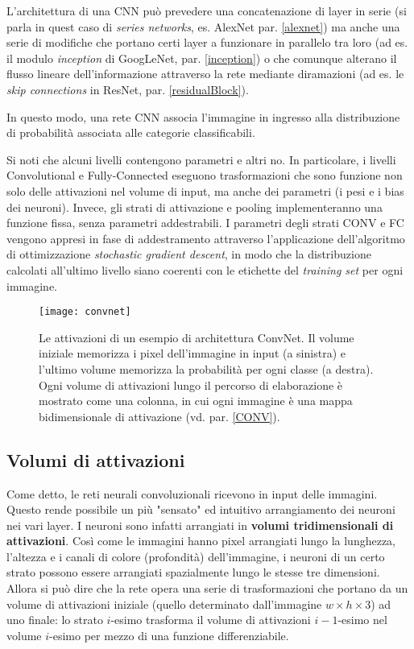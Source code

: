 L'architettura di una CNN può prevedere una concatenazione di layer in serie (si parla in quest caso di \textit{series networks}, es. AlexNet par. \ref{alexnet}) ma anche una serie di modifiche che portano certi layer a funzionare in parallelo tra loro (ad es. il modulo \textit{inception} di GoogLeNet, par. \ref{inception}) o che comunque alterano il flusso lineare dell'informazione attraverso la rete mediante diramazioni (ad es. le \textit{skip connections} in ResNet, par. \ref{residualBlock}).

In questo modo, una rete CNN associa l'immagine in ingresso alla distribuzione di probabilità associata alle categorie classificabili.

Si noti che alcuni livelli contengono parametri e altri no. In particolare, i livelli Convolutional e Fully-Connected eseguono trasformazioni che sono funzione non solo delle attivazioni nel volume di input, ma anche dei parametri (i pesi e i bias dei neuroni). Invece, gli strati di attivazione e pooling implementeranno una funzione fissa, senza parametri addestrabili. I parametri degli strati CONV e FC vengono appresi in fase di addestramento attraverso l'applicazione dell'algoritmo di ottimizzazione \textit{stochastic gradient descent}, in modo che la distribuzione calcolati all'ultimo livello siano coerenti con le etichette del \textit{training set} per ogni immagine.

\begin{figure}[h]
	\centering
	\texttt{[image: convnet]}
	\caption[Esempio di rete CNN]{Le attivazioni di un esempio di architettura ConvNet. Il volume iniziale memorizza i pixel dell'immagine in input (a sinistra) e l'ultimo volume memorizza la probabilità per ogni classe (a destra). Ogni volume di attivazioni lungo il percorso di elaborazione è mostrato come una colonna, in cui ogni immagine è una mappa bidimensionale di attivazione (vd. par. \ref{CONV}).}
	\label{fig:convnet}
\end{figure}

\subsection*{Volumi di attivazioni}
Come detto, le reti neurali convoluzionali ricevono in input delle immagini. Questo rende possibile un più "sensato" ed intuitivo arrangiamento dei neuroni nei vari layer. I neuroni sono infatti arrangiati in \textbf{volumi tridimensionali di attivazioni}. Così come le immagini hanno pixel arrangiati lungo la lunghezza, l'altezza e i canali di colore (profondità) dell'immagine, i neuroni di un certo strato possono essere arrangiati spazialmente lungo le stesse tre dimensioni. Allora si può dire che la rete opera una serie di trasformazioni che portano da un volume di attivazioni iniziale (quello determinato dall'immagine $w\times h\times 3$) ad uno finale: lo strato $i$-esimo trasforma il volume di attivazioni $i-1$-esimo nel volume $i$-esimo per mezzo di una funzione differenziabile.

